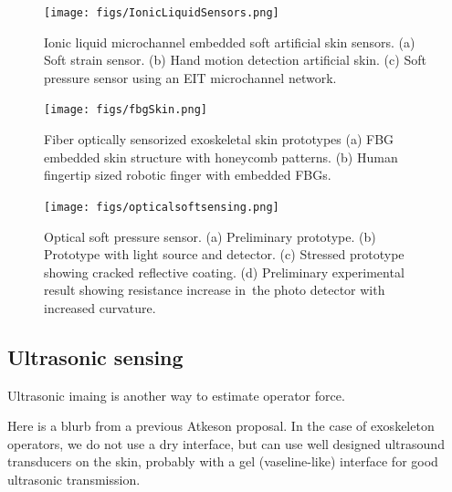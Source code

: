 \documentclass[letterpaper,12pt,fullpage]{article}
\begin{document}
\begin{figure}
\centering
\texttt{[image: figs/IonicLiquidSensors.png]}
\caption{Ionic liquid microchannel embedded soft artificial skin sensors. (a) Soft strain sensor. (b) Hand motion detection artificial skin. (c) Soft pressure sensor using an EIT microchannel network.}
\label{fig:IonicLiquidSensors}
\end{figure}

\begin{figure}
\centering
\texttt{[image: figs/fbgSkin.png]}
\caption{Fiber optically sensorized exoskeletal skin prototypes (a) FBG embedded skin structure with honeycomb patterns. (b) Human fingertip sized robotic finger with embedded FBGs.}
\label{fig:fbgSkin}
\end{figure}

\begin{figure}
\centering
\texttt{[image: figs/opticalsoftsensing.png]}
\caption{Optical soft pressure sensor. (a) Preliminary prototype. (b) Prototype with light source and detector. (c) Stressed prototype showing cracked reflective coating. (d) Preliminary experimental result showing resistance increase in\
 the photo detector with increased curvature.}
\label{fig:waveguidesoftsensor}
\end{figure}

\subsection{Ultrasonic sensing}

Ultrasonic imaing is another way to estimate operator force.

Here is a blurb from a previous Atkeson proposal.
In the case of exoskeleton operators, we do not use a dry interface,
but can use well designed ultrasound transducers on the skin, probably
with a gel (vaseline-like) interface for good ultrasonic transmission.
\end{document}
